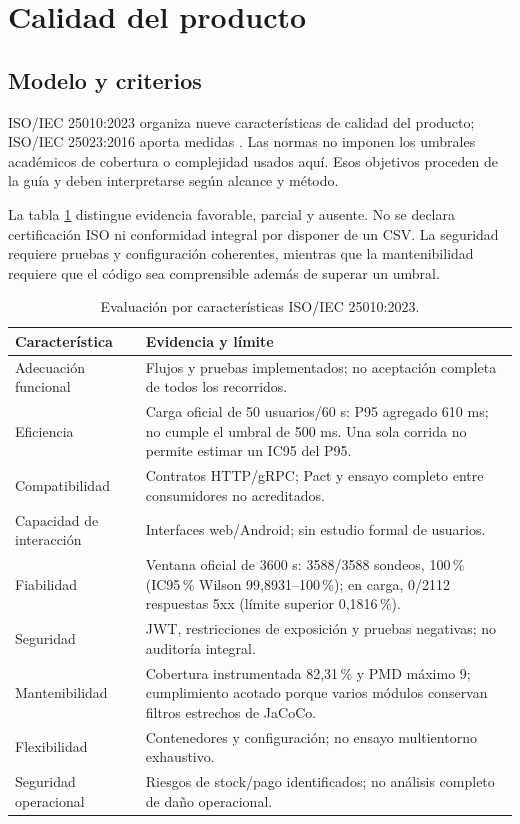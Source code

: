 \documentclass[12pt,a4paper]{article}
\newcommand{\seccion}[1]{\section{#1}}
\begin{document}
\seccion{Calidad del producto}
\subsection{Modelo y criterios}
ISO/IEC 25010:2023 organiza nueve características de calidad del producto; ISO/IEC 25023:2016 aporta medidas \cite{iso25010_2023,iso25023_2016}. Las normas no imponen los umbrales académicos de cobertura o complejidad usados aquí. Esos objetivos proceden de la guía y deben interpretarse según alcance y método.

La tabla \ref{tab:iso} distingue evidencia favorable, parcial y ausente. No se declara certificación ISO ni conformidad integral por disponer de un CSV. La seguridad requiere pruebas y configuración coherentes, mientras que la mantenibilidad requiere que el código sea comprensible además de superar un umbral.

\begin{table}[H]\centering\small
\caption{Evaluación por características ISO/IEC 25010:2023.}\label{tab:iso}
\begin{tabularx}{\textwidth}{lX}
\toprule Característica & Evidencia y límite\\\midrule
Adecuación funcional & Flujos y pruebas implementados; no aceptación completa de todos los recorridos.\\
Eficiencia & Carga oficial de 50 usuarios/60 s: P95 agregado 610 ms; no cumple el umbral de 500 ms. Una sola corrida no permite estimar un IC95 del P95.\\
Compatibilidad & Contratos HTTP/gRPC; Pact y ensayo completo entre consumidores no acreditados.\\
Capacidad de interacción & Interfaces web/Android; sin estudio formal de usuarios.\\
Fiabilidad & Ventana oficial de 3600 s: 3588/3588 sondeos, 100\,\% (IC95\,\% Wilson 99{,}8931--100\,\%); en carga, 0/2112 respuestas 5xx (límite superior 0{,}1816\,\%).\\
Seguridad & JWT, restricciones de exposición y pruebas negativas; no auditoría integral.\\
Mantenibilidad & Cobertura instrumentada 82{,}31\,\% y PMD máximo 9; cumplimiento acotado porque varios módulos conservan filtros estrechos de JaCoCo.\\
Flexibilidad & Contenedores y configuración; no ensayo multientorno exhaustivo.\\
Seguridad operacional & Riesgos de stock/pago identificados; no análisis completo de daño operacional.\\\bottomrule
\end{tabularx}
\end{table}
\end{document}

